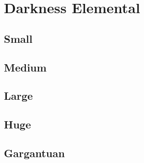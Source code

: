 \section{Darkness Elemental}

\subsection{Small}

\subsection{Medium}

\subsection{Large}

\subsection{Huge}

\subsection{Gargantuan}